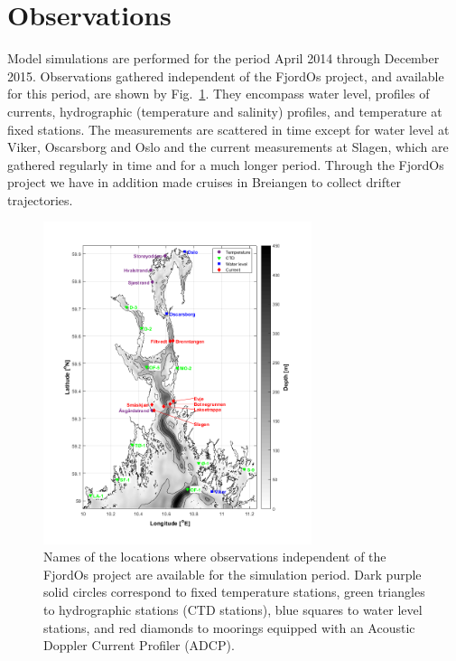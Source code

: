 \section{Observations}
\label{sec:obser}

Model simulations are performed for the period April 2014 through December 2015. Observations gathered independent of the FjordOs project, and available for this period, are shown by Fig.~\ref{fig:kart_obs}. They encompass water level, profiles of currents, hydrographic (temperature and salinity) profiles, and temperature at fixed stations. The measurements are scattered in time except for water level at Viker, Oscarsborg and Oslo and the current measurements at Slagen, which are gathered regularly in time and for a much longer period. Through the FjordOs project we have in addition made cruises in Breiangen to collect drifter trajectories.

\begin{figure}[htb]
\centerline{
\includegraphics*[trim=0cm 0.8cm 0cm 0cm,clip=true,width=0.7\textwidth]{Figurer/kart_obs}
}
\caption{\small Names of the locations where observations independent of the FjordOs project are available for the simulation period. Dark purple solid circles correspond to fixed temperature stations, green triangles to hydrographic stations (CTD stations), blue squares to water level stations, and red diamonds to moorings equipped with an Acoustic Doppler Current Profiler (ADCP).}
\label{fig:kart_obs}
\end{figure}

